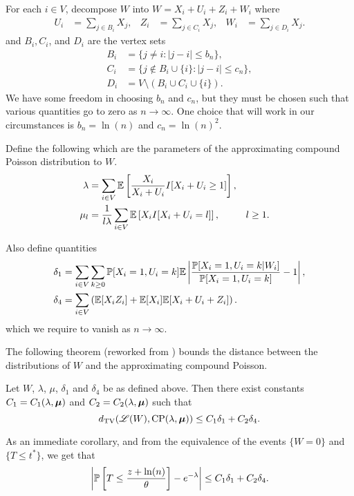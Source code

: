 	For each $i \in V$, decompose $W$ into $W = X_i + U_i + Z_i + W_i$ where
	\begin{align}
		U_i &= \sum_{j \in B_i} X_j, &
		Z_i &= \sum_{j \in C_i} X_j, &
		W_i &= \sum_{j \in D_i} X_j.
	\end{align}
	and $B_i, C_i$, and $D_i$ are the vertex sets
	\begin{align}
		B_i &= \{j\neq i : |j - i| \leq b_n \},\\
		C_i &= \{j\notin B_i\cup \{i\}: |j - i| \leq c_n \},\\
		D_i &= V \setminus (B_i \cup C_i \cup \{i\}).
	\end{align}
	We have some freedom in choosing $b_n$ and $c_n$, but they must be chosen such that various quantities go to zero as $n \rightarrow \infty$. One choice that will work in our circumstances is $b_n = \ln(n)$ and $c_n = \ln(n)^2$.

	Define the following which are the parameters of the approximating compound Poisson distribution to $W$.
	\begin{align}
		\lambda &= \sum_{i \in V} \mathbb{E}\left[\frac{X_i}{X_i + U_i} I[ X_i + U_i \geq 1] \right],\\
		\mu_l &= \frac{1}{l \lambda} \sum_{i \in V} \mathbb{E}\left[ X_i I[X_i + U_i = l] \right], && l\geq 1.
	\end{align}

	Also define quantities
	\begin{align}
		\delta_1 &= \sum_{i \in V}  \sum_{k \geq 0} \mathbb{P}[X_i = 1, U_i = k] \mathbb{E} \left|\frac{\mathbb{P}[X_i = 1, U_i = k|W_i]}{\mathbb{P}[X_i = 1, U_i = k]} - 1 \right|,\\ 
		\delta_4 &= \sum_{i \in V} \left( \mathbb{E}[X_i Z_i] + \mathbb{E}[X_i] \mathbb{E}[X_i + U_i + Z_i] \right).
	\end{align}
	which we require to vanish as $n \rightarrow \infty$.

	The following theorem (reworked from \cite{Barbour2001-nh}) bounds the distance between the distributions of $W$ and the approximating compound Poisson.

	\begin{theorem}
	\label{thm: compound poisson approximation}
		Let $W$, $\lambda$, $\mu$, $\delta_1$ and $\delta_4$ be as defined above. Then there exist constants $C_1 = C_1(\lambda, {\bm{{\mu}}})$ and $C_2 = C_2(\lambda, {\bm{{\mu}}})$ such that
		\begin{equation}
			d_{\mathrm{TV}}(\mathscr{L}(W), \mathrm{CP}(\lambda, {\bm{{\mu}}})) \leq C_1 \delta_1 + C_2 \delta_4.
		\end{equation}
	\end{theorem}
	As an immediate corollary, and from the equivalence of the events $\{W = 0\}$ and $\{T \leq t^*\}$, we get that
	\begin{equation}
		\left|\mathbb{P}\left[T \leq \frac{z+\ln(n)}{\theta}\right] - e^{-\lambda}\right| \leq C_1 \delta_1 + C_2 \delta_4.
		\label{eq:bound distance prob[w=0] and e^-lambda}
	\end{equation}

